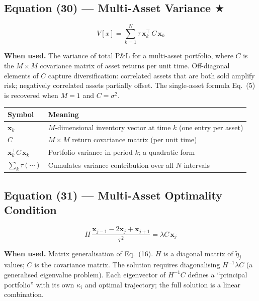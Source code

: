 \documentclass[11pt,a4paper]{article}
\begin{document}
\subsection*{Equation (30) — Multi-Asset Variance \texorpdfstring{$\bigstar$}{}}

\begin{equation}
  V[x] = \sum_{k=1}^{N} \tau\,\mathbf{x}_k^\top\,C\,\mathbf{x}_k
\end{equation}

\textbf{When used.} The variance of total P\&L for a multi-asset portfolio, where $C$ is
the $M\times M$ covariance matrix of asset returns per unit time.  Off-diagonal elements
of $C$ capture diversification: correlated assets that are both sold amplify risk;
negatively correlated assets partially offset.  The single-asset formula Eq.~(5) is
recovered when $M=1$ and $C=\sigma^2$.

\begin{center}
\begin{tabular}{@{}L{3.5cm}L{10cm}@{}}
\toprule
\textbf{Symbol} & \textbf{Meaning} \\
\midrule
$\mathbf{x}_k$ & $M$-dimensional inventory vector at time $k$ (one entry per asset) \\
$C$ & $M\times M$ return covariance matrix (per unit time) \\
$\mathbf{x}_k^\top C\,\mathbf{x}_k$ & Portfolio variance in period $k$; a quadratic form \\
$\sum_k\tau(\cdots)$ & Cumulates variance contribution over all $N$ intervals \\
\bottomrule
\end{tabular}
\end{center}

\subsection*{Equation (31) — Multi-Asset Optimality Condition}

\begin{equation}
  H\,\frac{\mathbf{x}_{j-1} - 2\mathbf{x}_j + \mathbf{x}_{j+1}}{\tau^2}
  = \lambda C\,\mathbf{x}_j
\end{equation}

\textbf{When used.} Matrix generalisation of Eq.~(16).  $H$ is a diagonal matrix of
$\tilde{\eta}_j$ values; $C$ is the covariance matrix.  The solution requires
diagonalising $H^{-1}\lambda C$ (a generalised eigenvalue problem).  Each eigenvector of
$H^{-1}C$ defines a ``principal portfolio'' with its own $\kappa_i$ and optimal
trajectory; the full solution is a linear combination.
\end{document}
